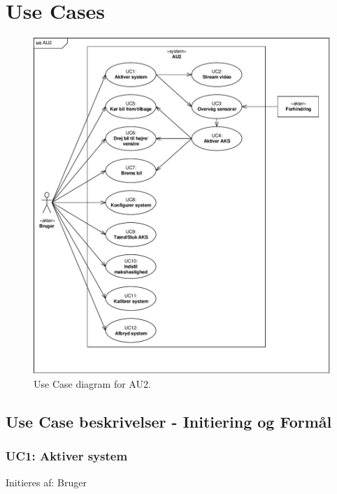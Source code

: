 \section{Use Cases}

\begin{figure}[h]
\centering
\includegraphics[width=\textwidth - 1 cm]{../fig/diagrammer/uc_au2.pdf}
\caption{Use Case diagram for AU2.}
\label{fig:UC_au2}
\end{figure}
\clearpage


\subsection{Use Case beskrivelser - Initiering og Formål} 
\subsubsection{UC1: Aktiver system}
Initieres af: Bruger

